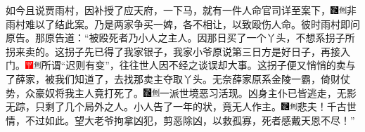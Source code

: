如今且说贾雨村，因补授了应天府，一下马，就有一件人命官司详至案下，{\includegraphics[width=3mm]{../Images/00006}\includegraphics[width=3mm]{../Images/00011}\footnotesize \kaishu 非雨村难以了结此案。}乃是两家争买一婢，各不相让，以致殴伤人命。彼时雨村即问原告。那原告道：“被殴死者乃小人之主人。因那日买了一个丫头，不想系拐子所拐来卖的。这拐子先已得了我家银子，我家小爷原说第三日方是好日子，再接入门。{\includegraphics[width=3mm]{../Images/00002}\includegraphics[width=3mm]{../Images/00011}\footnotesize \kaishu 所谓“迟则有变”，往往世人因不经之谈误却大事。}这拐子便又悄悄的卖与了薛家，被我们知道了，去找那卖主夺取丫头。无奈薛家原系金陵一霸，倚财仗势，众豪奴将我主人竟打死了。{\includegraphics[width=3mm]{../Images/00006}\includegraphics[width=3mm]{../Images/00011}\footnotesize \kaishu 一派世境恶习活现。}凶身主仆已皆逃走，无影无踪，只剩了几个局外之人。小人告了一年的状，竟无人作主。{\includegraphics[width=3mm]{../Images/00006}\includegraphics[width=3mm]{../Images/00011}\footnotesize \kaishu 悲夫！千古世情，不过如此。}望大老爷拘拿凶犯，剪恶除凶，以救孤寡，死者感戴天恩不尽！”

